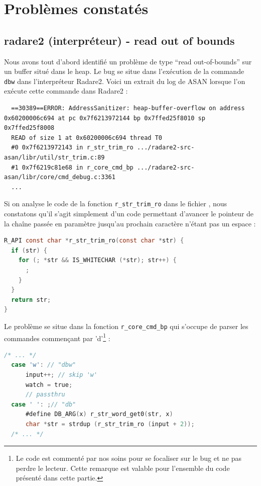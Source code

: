 \section{Problèmes constatés}

\subsection{radare2 (interpréteur) - read out of bounds}

Nous avons tout d'abord identifié un problème de type ``read out-of-bounds'' sur un buffer situé dans le heap.
Le bug se situe dans l'exécution de la commande \lstinline{dbw} dans l'interpréteur Radare2.
Voici un extrait du log de ASAN lorsque l'on exécute cette commande dans Radare2 :

\begin{lstlisting}
  ==30389==ERROR: AddressSanitizer: heap-buffer-overflow on address 0x60200006c694 at pc 0x7f6213972144 bp 0x7ffed25f8010 sp 0x7ffed25f8008
  READ of size 1 at 0x60200006c694 thread T0
  #0 0x7f6213972143 in r_str_trim_ro .../radare2-src-asan/libr/util/str_trim.c:89
  #1 0x7f6219c81e68 in r_core_cmd_bp .../radare2-src-asan/libr/core/cmd_debug.c:3361
  ...
\end{lstlisting}

Si on analyse le code de la fonction \lstinline{r_str_trim_ro} dans le fichier , nous constatons qu'il s'agit simplement d'un code permettant d'avancer le pointeur de la chaîne passée en paramètre jusqu'au prochain caractère n'étant pas un espace :

\begin{lstlisting}[language=C]
R_API const char *r_str_trim_ro(const char *str) {
  if (str) {
    for (; *str && IS_WHITECHAR (*str); str++) {
      ;
    }
  }
  return str;
}
\end{lstlisting}

Le problème se situe dans la fonction \lstinline{r_core_cmd_bp} qui s'occupe de parser les commandes commençant par 'd'\footnote{Le code est commenté par nos soins pour se focaliser sur le bug et ne pas perdre le lecteur. Cette remarque est valable pour l'ensemble du code présenté dans cette partie.} :

\begin{lstlisting}[language=C]
  /* ... */
  case 'w': // "dbw"
      input++; // skip 'w'
      watch = true;
      // passthru
  case ' ': ;// "db"
      #define DB_ARG(x) r_str_word_get0(str, x)
      char *str = strdup (r_str_trim_ro (input + 2));
  /* ... */
\end{lstlisting}

